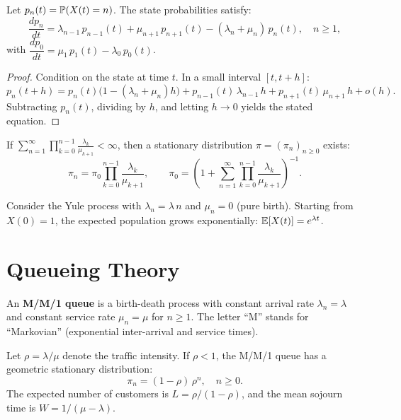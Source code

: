 \begin{proposition}
\label{prop:kolmogorov_bd}
Let $p_n(t) = \mathbb{P}(X(t) = n)$. The state probabilities satisfy:
\[
  \frac{dp_n}{dt} = \lambda_{n-1}\, p_{n-1}(t) + \mu_{n+1}\, p_{n+1}(t)
    - (\lambda_n + \mu_n)\, p_n(t), \quad n \geq 1,
\]
with $\dfrac{dp_0}{dt} = \mu_1\, p_1(t) - \lambda_0\, p_0(t)$.
\end{proposition}

\begin{proof}
Condition on the state at time $t$. In a small interval $[t, t+h]$:
\[
  p_n(t+h) = p_n(t)\bigl(1 - (\lambda_n + \mu_n)h\bigr)
    + p_{n-1}(t)\,\lambda_{n-1}\,h + p_{n+1}(t)\,\mu_{n+1}\,h + o(h).
\]
Subtracting $p_n(t)$, dividing by $h$, and letting $h \to 0$ yields
the stated equation.
\end{proof}

\begin{theorem}
\label{thm:stat_bd}
If $\sum_{n=1}^{\infty} \prod_{k=0}^{n-1} \frac{\lambda_k}{\mu_{k+1}}
< \infty$, then a stationary distribution $\pi = (\pi_n)_{n \geq 0}$ exists:
\[
  \pi_n = \pi_0 \prod_{k=0}^{n-1} \frac{\lambda_k}{\mu_{k+1}},
  \qquad \pi_0 = \left(1 + \sum_{n=1}^{\infty} \prod_{k=0}^{n-1}
  \frac{\lambda_k}{\mu_{k+1}}\right)^{-1}.
\]
\end{theorem}

\begin{example}
Consider the Yule process with $\lambda_n = \lambda\,n$
and $\mu_n = 0$ (pure birth). Starting from $X(0) = 1$, the expected
population grows exponentially: $\mathbb{E}[X(t)] = e^{\lambda t}$.
\end{example}

\section{Queueing Theory}
\label{sec:queueing}

\begin{definition}[M/M/1 Queue]
An \textbf{M/M/1 queue} is a birth-death process with constant arrival
rate $\lambda_n = \lambda$ and constant service rate $\mu_n = \mu$ for
$n \geq 1$. The letter ``M'' stands for ``Markovian'' (exponential
inter-arrival and service times).
\end{definition}

\begin{theorem}[M/M/1 Equilibrium]
\label{thm:mm1}
Let $\rho = \lambda / \mu$ denote the traffic intensity.
If $\rho < 1$, the M/M/1 queue has a geometric stationary distribution:
\[
  \pi_n = (1 - \rho)\,\rho^n, \quad n \geq 0.
\]
The expected number of customers is $L = \rho/(1-\rho)$, and the mean
sojourn time is $W = 1/(\mu - \lambda)$.
\end{theorem}

